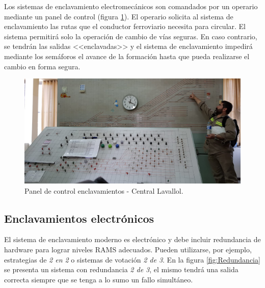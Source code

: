 			\vspace{7cm}
			
			Los sistemas de enclavamiento electromecánicos son comandados por un operario mediante un panel de control (figura \ref{fig:Electromecanico}). El operario solicita al sistema de enclavamiento las rutas que el conductor ferroviario necesita para circular. El sistema permitirá solo la operación de cambio de vías seguras. En caso contrario, se tendrán las salidas <<enclavadas>> y el sistema de enclavamiento impedirá mediante los semáforos el avance de la formación hasta que pueda realizarse el cambio en forma segura.
		
			\begin{figure}[h!]
				\centering
				\includegraphics[scale=.27]{./Figures/Electromecanico}
				\caption{Panel de control enclavamientos - Central Lavallol.}
				\label{fig:Electromecanico}
			\end{figure}
		
			
		
		\subsection{Enclavamientos electrónicos}
		\label{sec:Redundancia}	
			
			El sistema de enclavamiento moderno es electrónico y debe incluir redundancia de hardware para lograr niveles RAMS adecuados. Pueden utilizarse, por ejemplo, estrategias de \emph{2 en 2} o sistemas de votación \emph{2 de 3}. En la figura \ref{fig:Redundancia} se presenta un sistema con redundancia \emph{2 de 3}, el mismo tendrá una salida correcta siempre que se tenga a lo sumo un fallo simultáneo\citep{REDUNDANCIA}. 
			
